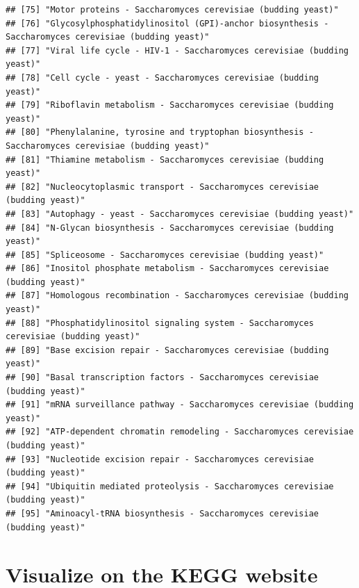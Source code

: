 \documentclass[
]{book}
\begin{document}
\begin{verbatim}
## [75] "Motor proteins - Saccharomyces cerevisiae (budding yeast)"                                        
## [76] "Glycosylphosphatidylinositol (GPI)-anchor biosynthesis - Saccharomyces cerevisiae (budding yeast)"
## [77] "Viral life cycle - HIV-1 - Saccharomyces cerevisiae (budding yeast)"                              
## [78] "Cell cycle - yeast - Saccharomyces cerevisiae (budding yeast)"                                    
## [79] "Riboflavin metabolism - Saccharomyces cerevisiae (budding yeast)"                                 
## [80] "Phenylalanine, tyrosine and tryptophan biosynthesis - Saccharomyces cerevisiae (budding yeast)"   
## [81] "Thiamine metabolism - Saccharomyces cerevisiae (budding yeast)"                                   
## [82] "Nucleocytoplasmic transport - Saccharomyces cerevisiae (budding yeast)"                           
## [83] "Autophagy - yeast - Saccharomyces cerevisiae (budding yeast)"                                     
## [84] "N-Glycan biosynthesis - Saccharomyces cerevisiae (budding yeast)"                                 
## [85] "Spliceosome - Saccharomyces cerevisiae (budding yeast)"                                           
## [86] "Inositol phosphate metabolism - Saccharomyces cerevisiae (budding yeast)"                         
## [87] "Homologous recombination - Saccharomyces cerevisiae (budding yeast)"                              
## [88] "Phosphatidylinositol signaling system - Saccharomyces cerevisiae (budding yeast)"                 
## [89] "Base excision repair - Saccharomyces cerevisiae (budding yeast)"                                  
## [90] "Basal transcription factors - Saccharomyces cerevisiae (budding yeast)"                           
## [91] "mRNA surveillance pathway - Saccharomyces cerevisiae (budding yeast)"                             
## [92] "ATP-dependent chromatin remodeling - Saccharomyces cerevisiae (budding yeast)"                    
## [93] "Nucleotide excision repair - Saccharomyces cerevisiae (budding yeast)"                            
## [94] "Ubiquitin mediated proteolysis - Saccharomyces cerevisiae (budding yeast)"                        
## [95] "Aminoacyl-tRNA biosynthesis - Saccharomyces cerevisiae (budding yeast)"
\end{verbatim}

\hypertarget{visualize-on-the-kegg-website}{%
\section{Visualize on the KEGG website}\label{visualize-on-the-kegg-website}}
\end{document}

